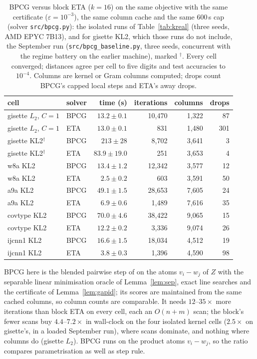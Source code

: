 \documentclass{opt2026}   %
\begin{document}
\begin{table}[h]\centering\scriptsize
\caption{BPCG \cite{tsuji2022} versus block ETA ($k{=}16$) on the same
objective with the same certificate ($\varepsilon{=}10^{-3}$), the same
column cache and the same 600\,s cap (solver \texttt{src/bpcg.py}):
the isolated runs of Table~\ref{tab:kreal} (three seeds, AMD EPYC
7B13), and for gisette KL2, which those runs do not include, the
September run (\texttt{src/bpcg\_baseline.py}, three seeds, concurrent
with the regime battery on the earlier machine), marked $^\dagger$.
Every cell converged; distances agree per cell to five digits and test
accuracies to $10^{-4}$. Columns are kernel or Gram columns computed;
drops count BPCG's capped local steps and ETA's away drops.}\label{tab:bpcg}
\begin{tabular}{llrrrr}\toprule
cell & solver & time (s) & iterations & columns & drops \\\midrule
gisette $L_2$, $C{=}1$ & BPCG & $13.2\pm0.1$ & 10,470 & 1,322 & 87 \\
gisette $L_2$, $C{=}1$ & ETA & $13.0\pm0.1$ & 831 & 1,480 & 301 \\
\midrule
gisette KL2$^\dagger$ & BPCG & $213\pm28$ & 8,702 & 3,641 & 3 \\
gisette KL2$^\dagger$ & ETA & $83.9\pm19.0$ & 251 & 3,653 & 4 \\
w8a KL2 & BPCG & $13.4\pm1.2$ & 12,342 & 3,577 & 12 \\
w8a KL2 & ETA & $2.5\pm0.2$ & 603 & 3,591 & 50 \\
a9a KL2 & BPCG & $49.1\pm1.5$ & 28,653 & 7,605 & 24 \\
a9a KL2 & ETA & $6.9\pm0.6$ & 1,489 & 7,616 & 35 \\
covtype KL2 & BPCG & $70.0\pm4.6$ & 38,422 & 9,065 & 15 \\
covtype KL2 & ETA & $12.2\pm0.2$ & 3,336 & 9,074 & 26 \\
ijcnn1 KL2 & BPCG & $16.6\pm1.5$ & 18,034 & 4,512 & 19 \\
ijcnn1 KL2 & ETA & $3.8\pm0.3$ & 1,396 & 4,590 & 98 \\
\bottomrule\end{tabular}\end{table}

BPCG here is the blended pairwise step of \cite{tsuji2022} on the
atoms $v_i-w_j$ of $Z$ with the separable linear minimisation oracle of Lemma~\ref{lem:sep},
exact line searches and the certificate of Lemma~\ref{lem:gapid}; its
scores are maintained from the same cached columns, so column counts
are comparable. It needs $12$--$35\times$ more iterations than block
ETA on every cell, each an $O(n+m)$ scan; the block's fewer scans buy
$4.4$--$7.2\times$ in wall-clock on the four isolated kernel cells
($2.5\times$ on gisette's, in a loaded September run), where scans dominate,
and nothing where columns do (gisette $L_2$). BPCG runs on the product atoms
$v_i-w_j$, so the ratio compares parametrisation as well as step rule.
\end{document}
